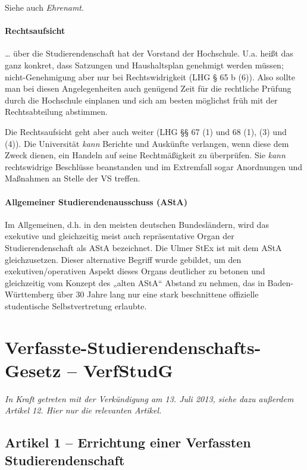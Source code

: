 \documentclass[
10pt,
a4paper,
twoside,								%
titlepage=false,							%
draft=false								%
]{scrartcl}
\begin{document}
Siehe auch \emph{Ehrenamt}.


\paragraph{Rechtsaufsicht}

… über die Studierendenschaft hat der Vorstand der Hochschule. U.a. heißt das ganz konkret, dass Satzungen und Haushaltsplan genehmigt werden müssen; nicht-Genehmigung aber nur bei Rechtswidrigkeit (LHG § 65 b (6)). Also sollte man bei diesen Angelegenheiten auch genügend Zeit für die rechtliche Prüfung durch die Hochschule einplanen und sich am besten möglichst früh mit der Rechtsabteilung abstimmen.

Die Rechtsaufsicht geht aber auch weiter (LHG §§ 67 (1) und 68 (1), (3) und (4)). Die Universität \emph{kann} Berichte und Auskünfte verlangen, wenn diese dem Zweck dienen, ein Handeln auf seine Rechtmäßigkeit zu überprüfen. Sie \emph{kann} rechtswidrige Beschlüsse beanstanden und im Extremfall sogar Anordnungen und Maßnahmen an Stelle der VS treffen.


\paragraph{Allgemeiner Studierendenausschuss (AStA)}

Im Allgemeinen, d.h. in den meisten deutschen Bundesländern, wird das exekutive und gleichzeitig meist auch repräsentative Organ der Studierendenschaft als AStA bezeichnet. Die Ulmer StEx ist mit dem AStA gleichzusetzen. Dieser alternative Begriff wurde gebildet, um den exekutiven/operativen Aspekt dieses Organs deutlicher zu betonen und gleichzeitig vom Konzept des „alten AStA“ Abstand zu nehmen, das in Baden-Württemberg über 30 Jahre lang nur eine stark beschnittene offizielle studentische Selbstvertretung erlaubte.



\appendix

\newpage
\section{Verfasste-Studierendenschafts-Gesetz – VerfStudG}

\emph{In Kraft getreten mit der Verkündigung am 13. Juli 2013, siehe dazu außerdem Artikel 12. Hier nur die relevanten Artikel.}

\subsection{Artikel 1 – Errichtung einer Verfassten Studierendenschaft}
\end{document}
